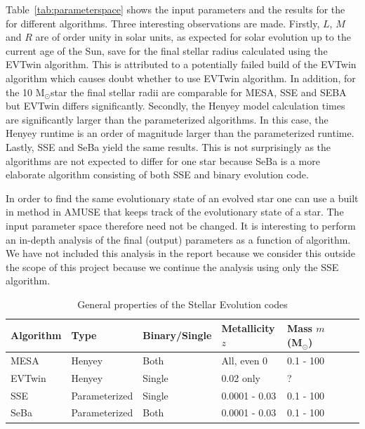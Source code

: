 \documentclass{aa}
\newcommand{\Sun}[0]{\ensuremath{_{\odot}}}
\begin{document}
Table~\ref{tab:parameterspace} shows the input parameters and the results for the for different algorithms. Three interesting observations are made. Firstly, $L$, $M$ and $R$ are of order unity in solar units, as expected for solar evolution up to the current age of the Sun, save for the final stellar radius calculated using the EVTwin algorithm. This is attributed to a potentially failed build of the EVTwin algorithm which causes doubt whether to use EVTwin algorithm. In addition, for the 10 M\Sun star the final stellar radii are comparable for MESA, SSE and SEBA but EVTwin differs significantly. Secondly, the Henyey model calculation times are significantly larger than the parameterized algorithms. In this case, the Henyey runtime is an order of magnitude larger than the parameterized runtime. Lastly, SSE and SeBa yield the same results. This is not surprisingly as the algorithms are not expected to differ for one star because SeBa is a more elaborate algorithm consisting of both SSE and binary evolution code.

In order to find the same evolutionary state of an evolved star one can use a built in method in AMUSE that keeps track of the evolutionary state of a star. The input parameter space therefore need not be changed. It is interesting to perform an in-depth analysis of the final (output) parameters as a function of algorithm. We have not included this analysis in the report because we consider this outside the scope of this project because we continue the analysis using only the SSE algorithm.

\begin{table}
    \caption{General properties of the Stellar Evolution codes \citep{AMUSEdocumentation}}
    \label{tab:algorithms}
    \centering
    \begin{tabular}{l l l l l l l l }
        \hline\hline
        Algorithm & Type & Binary/Single & Metallicity $z$ & Mass $m$ (M\Sun) \\
        \hline
        MESA & Henyey & Both & All, even 0 & 0.1 - 100 \\
        EVTwin & Henyey & Single\footnotemark[1] & 0.02 only & ? \\
        SSE & Parameterized & Single & 0.0001 - 0.03 & 0.1 - 100 \\
        SeBa & Parameterized & Both & 0.0001 - 0.03 & 0.1 - 100 \\
        \hline
    \end{tabular}
\end{table}
\addtocounter{footnote}{1}
\footnotetext[\value{footnote}]{Binaries are not yet available in AMUSE EVTwin Interface.}
\end{document}
